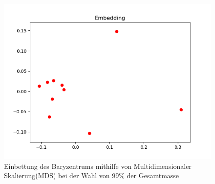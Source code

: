 \documentclass[twoside, 11pt,a4paper]{article}
\numberwithin{equation}{section}
\begin{document}
	\begin{figure}[h]
		\begin{center}
			\includegraphics[width=0.5\textheight]{bary_embedding99.png}
			\caption{Einbettung des Baryzentrums mithilfe von Multidimensionaler Skalierung(MDS) bei der Wahl von $99\%$ der Gesamtmasse}
		\end{center}
	\end{figure}
	
	
	
\end{document}
